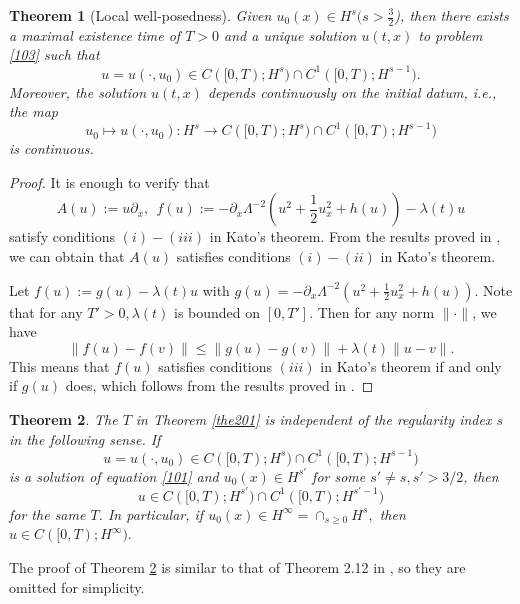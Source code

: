 \documentclass[preprint,12pt]{elsarticle}
\numberwithin{equation}{section}
\newtheorem{theorem}{Theorem}[section]
\begin{document}
\begin{theorem}[Local well-posedness]
\label{the202}  Given $u_{0}(x)\in H^{s}(s>\frac{3}{2}$), then there exists a maximal existence time of $T>0$ and a unique solution $u(t,x)$ to problem \eqref{103} such that
$$u=u(\cdot,u_{0})\in C([0,T);H^{s})\cap C^{1}([0,T);H^{s-1}).$$
Moreover, the solution $u(t,x)$ depends continuously on the initial datum, i.e., the map
$$u_{0}\mapsto u(\cdot,u_{0}):H^{s}\rightarrow C([0,T);H^{s})\cap C^{1}([0,T);H^{s-1})$$
is continuous.

\end{theorem}
\begin{proof}
It is enough to verify that
\begin{equation*}
A(u):=u\partial_{x},\ \ f(u):=-\partial_{x}\Lambda^{-2}\left(u^{2}+\frac{1}{2}u_{x}^{2}+h(u)\right)-\lambda(t) u
\end{equation*}
satisfy conditions $(i)-(iii)$ in Kato's theorem. From the results proved in \cite{Freire1}, we can obtain that $A(u)$ satisfies conditions $(i)-(ii)$ in Kato's theorem.

Let $f(u):=g(u)-\lambda(t) u$ with $g(u)=-\partial_{x}\Lambda^{-2}\left(u^{2}+\frac{1}{2}u_{x}^{2}+h(u)\right)$. Note that for any $T'>0, \lambda(t)$ is bounded on $[0, T']$. Then for any norm $\|\cdot\|$, we have
$$\|f(u)-f(v)\|\leq\|g(u)-g(v)\|+\lambda(t)\|u-v\|.$$
This means that $f(u)$ satisfies conditions $(iii)$ in Kato's theorem if and only if $g(u)$ does, which follows from the results proved in \cite{Freire1}.
\end{proof}
\begin{theorem}
\label{the202a}  The $T$ in Theorem \ref{the201} is independent of the regularity index $s$ in the following sense. If
$$u=u(\cdot, u_{0})\in C([0,T); H^{s})\cap C^{1}([0,T); H^{s-1})$$
is a solution of equation \eqref{101} and $u_{0}(x)\in H^{s'}$ for some $s'\neq s, s'>3/2$, then
$$u\in C([0,T); H^{s'})\cap C^{1}([0,T); H^{s'-1})$$
for the same $T$. In particular, if $u_{0}(x)\in H^{\infty}=\cap_{s\geq 0}H^{s},$ then $u\in C([0,T);H^{\infty}).$
\end{theorem}

The proof of Theorem \ref{the202a} is similar to that of Theorem 2.12 in \cite{Ji2021}, so
they are omitted for simplicity.
\end{document}
